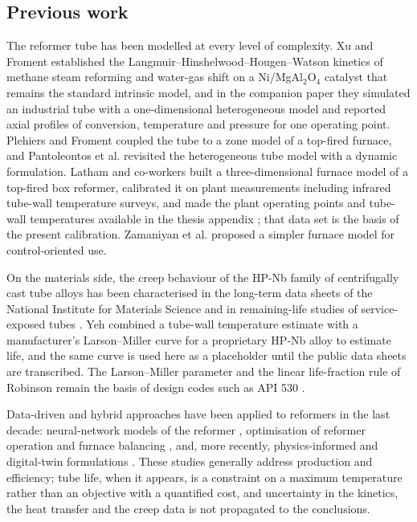 \subsection{Previous work}

The reformer tube has been modelled at every level of complexity. Xu and Froment \cite{xu1989a} established the
Langmuir--Hinshelwood--Hougen--Watson kinetics of methane steam reforming and water-gas shift on a Ni/MgAl$_2$O$_4$ catalyst that
remains the standard intrinsic model, and in the companion paper \cite{xu1989b} they simulated an industrial tube with a
one-dimensional heterogeneous model and reported axial profiles of conversion, temperature and pressure for one operating point.
Plehiers and Froment \cite{plehiers1989} coupled the tube to a zone model of a top-fired furnace, and Pantoleontos et al.
\cite{pantoleontos2012} revisited the heterogeneous tube model with a dynamic formulation. Latham and co-workers
\cite{latham2008,latham2011} built a three-dimensional furnace model of a top-fired box reformer, calibrated it on plant measurements
including infrared tube-wall temperature surveys, and made the plant operating points and tube-wall temperatures available in the
thesis appendix \cite{latham2008}; that data set is the basis of the present calibration. Zamaniyan et al. \cite{zamaniyan2008}
proposed a simpler furnace model for control-oriented use.

On the materials side, the creep behaviour of the HP-Nb family of centrifugally cast tube alloys has been characterised in the
long-term data sheets of the National Institute for Materials Science \cite{nims1990,nims1991} and in remaining-life studies of
service-exposed tubes \cite{ray2003,whittaker2013,haidemenopoulos2021,guguloth2023}. Yeh \cite{yeh2021} combined a tube-wall
temperature estimate with a manufacturer's Larson--Miller curve for a proprietary HP-Nb alloy to estimate life, and the same
curve is used here as a placeholder until the public data sheets are transcribed. The Larson--Miller parameter \cite{larson1952}
and the linear life-fraction rule of Robinson \cite{robinson1952} remain the basis of design codes such as API 530 \cite{api530}.

Data-driven and hybrid approaches have been applied to reformers in the last decade: neural-network models of the reformer
\cite{lao2016,tran2017}, optimisation of reformer operation and furnace balancing \cite{kumar2015,kumar2017}, and, more recently,
physics-informed and digital-twin formulations \cite{yerimah2025,jafarizadeh2024,nabavi2025}. These studies generally address
production and efficiency; tube life, when it appears, is a constraint on a maximum temperature rather than an objective with a
quantified cost, and uncertainty in the kinetics, the heat transfer and the creep data is not propagated to the conclusions.

